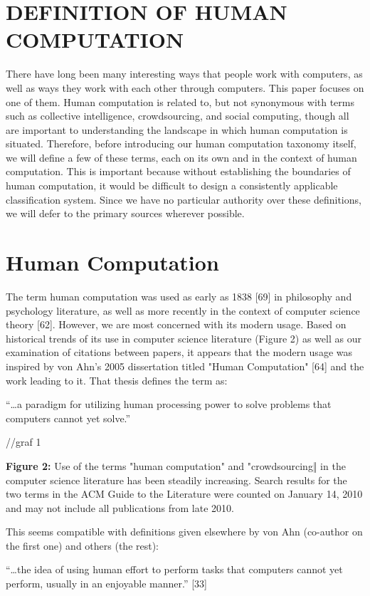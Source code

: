 \documentclass{acm_proc_article-sp} %
\begin{document}
\section{DEFINITION OF HUMAN COMPUTATION}
 There have long been many interesting ways that people work with computers, as well as ways they work with each other through computers. This paper focuses on one of them. Human computation is related to, but not synonymous with terms such as collective intelligence, crowdsourcing, and social computing, though all are important to understanding the landscape in which human computation is situated. Therefore, before introducing our human computation taxonomy itself, we will define a few of these terms, each on its own and in the context of human computation. This is important because without establishing the boundaries of human computation, it would be difficult to design a consistently applicable classification system.  Since we have no particular authority over these definitions, we will defer to the primary sources wherever possible.

\section{Human Computation}
 The term human computation was used as early as 1838 [69] in philosophy and psychology literature, as well as more recently in the context of computer science theory [62]. However, we are most concerned with its modern usage. Based on historical trends of its use in computer science literature (Figure 2) as well as our examination of citations between papers, it appears that the modern usage was inspired by von Ahn’s 2005 dissertation titled "Human Computation" [64] and the work leading to it.  That thesis defines the term as: 

“…a paradigm for utilizing human processing power to solve problems that computers cannot yet solve.” 

//graf 1

\textbf{Figure 2:} Use of the terms "human computation" and "crowdsourcing‖ in the computer science literature has been steadily increasing. Search results for the two terms in the ACM Guide to the Literature were counted on January 14, 2010 and may not include all publications from late 2010. 

This seems compatible with definitions given elsewhere by von Ahn (co-author on the first one) and others (the rest): 

“…the idea of using human effort to perform tasks that computers cannot yet perform, usually in an enjoyable manner.” [33]
\end{document}
